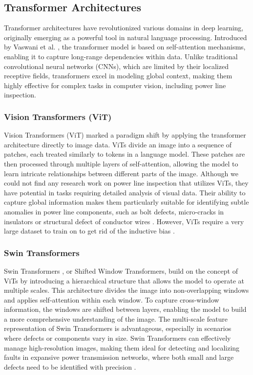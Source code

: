 \subsection{Transformer Architectures}
Transformer architectures have revolutionized various domains in deep learning, originally emerging as a powerful tool in natural language processing. Introduced by Vaswani et al. \cite{vaswani2017attention}, the transformer model is based on self-attention mechanisms, enabling it to capture long-range dependencies within data. Unlike traditional convolutional neural networks (CNNs), which are limited by their localized receptive fields, transformers excel in modeling global context, making them highly effective for complex tasks in computer vision, including power line inspection.

\subsubsection{Vision Transformers (ViT)}

Vision Transformers (ViT) \cite{dosovitskiy2020image} marked a paradigm shift by applying the transformer architecture directly to image data. ViTs divide an image into a sequence of patches, each treated similarly to tokens in a language model. These patches are then processed through multiple layers of self-attention, allowing the model to learn intricate relationships between different parts of the image. Although we could not find any research work on power line inspection that utilizes ViTs, they have potential in tasks requiring detailed analysis of visual data. Their ability to capture global information makes them particularly suitable for identifying subtle anomalies in power line components, such as bolt defects, micro-cracks in insulators or structural defect of conductor wires \cite{han2022survey}. However, ViTs require a very large dataset to train on to get rid of the inductive bias \cite{dosovitskiy2020image}. \\

\subsubsection{Swin Transformers}

Swin Transformers \cite{liu2021swintransformerhierarchicalvision}, or Shifted Window Transformers, build on the concept of ViTs by introducing a hierarchical structure that allows the model to operate at multiple scales. This architecture divides the image into non-overlapping windows and applies self-attention within each window. To capture cross-window information, the windows are shifted between layers, enabling the model to build a more comprehensive understanding of the image. The multi-scale feature representation of Swin Transformers is advantageous, especially in scenarios where defects or components vary in size. Swin Transformers can effectively manage high-resolution images, making them ideal for detecting and localizing faults in expansive power transmission networks, where both small and large defects need to be identified with precision \cite{dong_improved_2023}. \\

